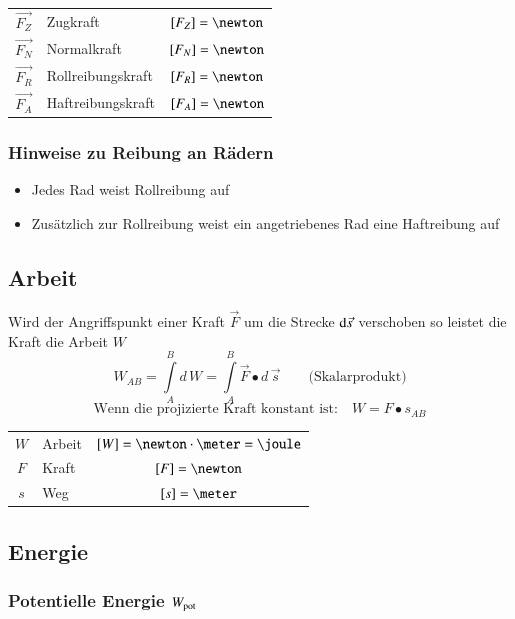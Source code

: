 \vspace{0.2cm}
\begin{tabular}{c l c}
	$\vec{F_Z}$ & Zugkraft 			& $[F_Z] = \newton$ \\
	$\vec{F_N}$ & Normalkraft 		& $[F_N] = \newton$ \\
	$\vec{F_R}$ & Rollreibungskraft & $[F_R] = \newton$ \\
	$\vec{F_A}$ & Haftreibungskraft & $[F_A] = \newton$
\end{tabular}


\subsubsection{Hinweise zu Reibung an Rädern}

\begin{itemize}
	\item Jedes Rad weist Rollreibung auf
	\item Zusätzlich zur Rollreibung weist ein angetriebenes Rad eine Haftreibung auf
\end{itemize}


\subsection{Arbeit}

Wird der Angriffspunkt einer Kraft $\vec{F}$ um die Strecke $\mathop{} \! \mathrm{d} \vec{s}$ verschoben so leistet die Kraft die Arbeit $W$ 
$$ \boxed{ W_{AB} =  \int \limits_A^B d \, W =  \int \limits_A^B \vec{F} \bullet d \, \vec{s} \qquad \text{(Skalarprodukt)} }$$
$$ \boxed{ \text{Wenn die projizierte Kraft konstant ist:} \quad  W = F \bullet s_{AB} } $$

\begin{tabular}{c l c}
	$W$ & Arbeit	& $[W] = \newton \cdot \meter = \joule$	\\
	$F$ & Kraft 	& $[F] = \newton$ 						\\
	$s$ & Weg 		& $[s] = \meter$ 						\\
\end{tabular}


\subsection{Energie}

\subsubsection{Potentielle Energie $W_{\rm pot}$}


